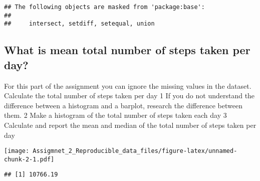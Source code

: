 \documentclass[]{article}
\newenvironment{Shaded}{\begin{snugshade}}{\end{snugshade}}
\newcommand{\KeywordTok}[1]{\textcolor[rgb]{0.13,0.29,0.53}{\textbf{#1}}}
\newcommand{\DataTypeTok}[1]{\textcolor[rgb]{0.13,0.29,0.53}{#1}}
\newcommand{\DecValTok}[1]{\textcolor[rgb]{0.00,0.00,0.81}{#1}}
\newcommand{\StringTok}[1]{\textcolor[rgb]{0.31,0.60,0.02}{#1}}
\newcommand{\OtherTok}[1]{\textcolor[rgb]{0.56,0.35,0.01}{#1}}
\newcommand{\OperatorTok}[1]{\textcolor[rgb]{0.81,0.36,0.00}{\textbf{#1}}}
\newcommand{\NormalTok}[1]{#1}
\begin{document}
\begin{verbatim}
## The following objects are masked from 'package:base':
## 
##     intersect, setdiff, setequal, union
\end{verbatim}

\subsection{What is mean total number of steps taken per
day?}\label{what-is-mean-total-number-of-steps-taken-per-day}

For this part of the assignment you can ignore the missing values in the
dataset. Calculate the total number of steps taken per day 1 If you do
not understand the difference between a histogram and a barplot,
research the difference between them. 2 Make a histogram of the total
number of steps taken each day 3 Calculate and report the mean and
median of the total number of steps taken per day

\begin{Shaded}
\end{Shaded}

\texttt{[image: Assigmnet\_2\_Reproducible\_data\_files/figure-latex/unnamed-chunk-2-1.pdf]}

\begin{Shaded}
\end{Shaded}

\begin{verbatim}
## [1] 10766.19
\end{verbatim}
\end{document}
